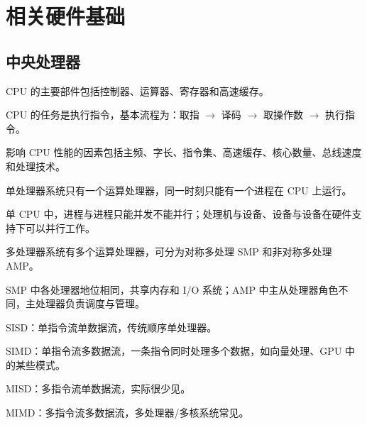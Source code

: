 \chapter{相关硬件基础}

\section{中央处理器}
\begin{points}
  \item CPU 的主要部件包括控制器、运算器、寄存器和高速缓存。
  \item CPU 的任务是执行指令，基本流程为：取指 $\rightarrow$ 译码 $\rightarrow$ 取操作数 $\rightarrow$ 执行指令。
  \item 影响 CPU 性能的因素包括主频、字长、指令集、高速缓存、核心数量、总线速度和处理技术。
\end{points}


\begin{points}
  \item 单处理器系统只有一个运算处理器，同一时刻只能有一个进程在 CPU 上运行。
  \item 单 CPU 中，进程与进程只能并发不能并行；处理机与设备、设备与设备在硬件支持下可以并行工作。
  \item 多处理器系统有多个运算处理器，可分为对称多处理 SMP 和非对称多处理 AMP。
  \item SMP 中各处理器地位相同，共享内存和 I/O 系统；AMP 中主从处理器角色不同，主处理器负责调度与管理。
\end{points}


\begin{points}
  \item SISD：单指令流单数据流，传统顺序单处理器。
  \item SIMD：单指令流多数据流，一条指令同时处理多个数据，如向量处理、GPU 中的某些模式。
  \item MISD：多指令流单数据流，实际很少见。
  \item MIMD：多指令流多数据流，多处理器/多核系统常见。
\end{points}


